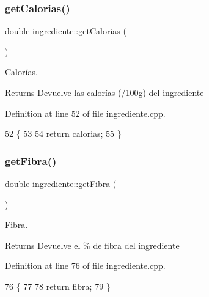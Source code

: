 \subsubsection{\texorpdfstring{get\+Calorias()}{getCalorias()}}
{\footnotesize\ttfamily double ingrediente\+::get\+Calorias (\begin{DoxyParamCaption}{ }\end{DoxyParamCaption})}



Calorías. 

\begin{DoxyReturn}{Returns}
Devuelve las calorías (/100g) del ingrediente 
\end{DoxyReturn}


Definition at line 52 of file ingrediente.\+cpp.


\begin{DoxyCode}
52                                \{
53 
54     \textcolor{keywordflow}{return} calorias;
55 \}
\end{DoxyCode}
\mbox{\label{classingrediente_a2477818722228f8b674a9ddd9e6743e7}} 
\subsubsection{\texorpdfstring{get\+Fibra()}{getFibra()}}
{\footnotesize\ttfamily double ingrediente\+::get\+Fibra (\begin{DoxyParamCaption}{ }\end{DoxyParamCaption})}



Fibra. 

\begin{DoxyReturn}{Returns}
Devuelve el \% de fibra del ingrediente 
\end{DoxyReturn}


Definition at line 76 of file ingrediente.\+cpp.


\begin{DoxyCode}
76                             \{
77 
78     \textcolor{keywordflow}{return} fibra;
79 \}
\end{DoxyCode}
\mbox{\label{classingrediente_a2e5b063794ee06868067df52ad35a23c}} 
